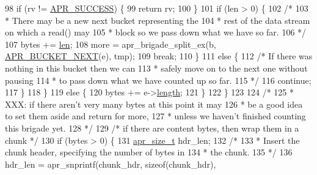 \begin{DoxyCode}
98                 \textcolor{keywordflow}{if} (rv != \hyperlink{group__apr__errno_ga9ee311b7bf1c691dc521d721339ee2a6}{APR\_SUCCESS}) \{
99                     \textcolor{keywordflow}{return} rv;
100                 \}
101                 \textcolor{keywordflow}{if} (len > 0) \{
102                     \textcolor{comment}{/*}
103 \textcolor{comment}{                     * There may be a new next bucket representing the}
104 \textcolor{comment}{                     * rest of the data stream on which a read() may}
105 \textcolor{comment}{                     * block so we pass down what we have so far.}
106 \textcolor{comment}{                     */}
107                     bytes += \hyperlink{group__APACHE__CORE__LOG_gab5a43233d60ef05c5b5bf5cba3d74468}{len};
108                     more = apr\_brigade\_split\_ex(b, \hyperlink{group__APR__Util__Bucket__Brigades_ga7171f690b203d548a5b6ae0b079068d8}{APR\_BUCKET\_NEXT}(e), tmp);
109                     \textcolor{keywordflow}{break};
110                 \}
111                 \textcolor{keywordflow}{else} \{
112                     \textcolor{comment}{/* If there was nothing in this bucket then we can}
113 \textcolor{comment}{                     * safely move on to the next one without pausing}
114 \textcolor{comment}{                     * to pass down what we have counted up so far.}
115 \textcolor{comment}{                     */}
116                     \textcolor{keywordflow}{continue};
117                 \}
118             \}
119             \textcolor{keywordflow}{else} \{
120                 bytes += e->\hyperlink{structapr__bucket_a0898dfc78d9275187189b9a745e619bf}{length};
121             \}
122         \}
123 
124         \textcolor{comment}{/*}
125 \textcolor{comment}{         * XXX: if there aren't very many bytes at this point it may}
126 \textcolor{comment}{         * be a good idea to set them aside and return for more,}
127 \textcolor{comment}{         * unless we haven't finished counting this brigade yet.}
128 \textcolor{comment}{         */}
129         \textcolor{comment}{/* if there are content bytes, then wrap them in a chunk */}
130         \textcolor{keywordflow}{if} (bytes > 0) \{
131             \hyperlink{group__apr__platform_gaaa72b2253f6f3032cefea5712a27540e}{apr\_size\_t} hdr\_len;
132             \textcolor{comment}{/*}
133 \textcolor{comment}{             * Insert the chunk header, specifying the number of bytes in}
134 \textcolor{comment}{             * the chunk.}
135 \textcolor{comment}{             */}
136             hdr\_len = apr\_snprintf(chunk\_hdr, \textcolor{keyword}{sizeof}(chunk\_hdr),

\end{DoxyCode}
